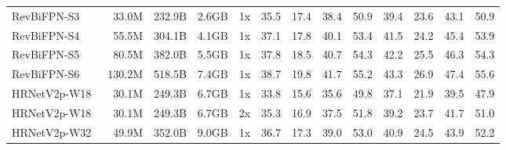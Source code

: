 \documentclass{article}
\begin{document}
\begin{table*}
{\begin{tabular}{lrrrrrrrrrrrr}
        RevBiFPN-S3                         \hspace{-10pt} &                   33.0M &                232.9B &                2.6GB & \hspace{-6pt}                  1x \hspace{-5pt} & 35.5 &     17.4 &     38.4 &     50.9 & 39.4 &     23.6 &     43.1 &     50.9 \\ 
        RevBiFPN-S4                         \hspace{-10pt} &                   55.5M &                304.1B &                4.1GB & \hspace{-6pt}                  1x \hspace{-5pt} & 37.1 &     17.8 &     40.1 &     53.4 & 41.5 &     24.2 &     45.4 &     53.9 \\ 
        RevBiFPN-S5                         \hspace{-10pt} &                   80.5M &                382.0B &                5.5GB & \hspace{-6pt}                  1x \hspace{-5pt} & 37.8 &     18.5 &     40.7 &     54.3 & 42.2 &     25.5 &     46.3 &     54.3 \\
        RevBiFPN-S6                         \hspace{-10pt} &                  130.2M &                518.5B &                7.4GB & \hspace{-6pt}                  1x \hspace{-5pt} & 38.7 &     19.8 &     41.7 &     55.2 & 43.3 &     26.9 &     47.4 &     55.6 \\ \midrule
        HRNetV2p-W18~\cite{wang2020hrnet}   \hspace{-10pt} &                   30.1M &                249.3B &                6.7GB & \hspace{-6pt}                  1x \hspace{-5pt} & 33.8 &     15.6 &     35.6 &     49.8 & 37.1 &     21.9 &     39.5 &     47.9 \\
        HRNetV2p-W18~\cite{wang2020hrnet}   \hspace{-10pt} &                   30.1M &                249.3B &                6.7GB & \hspace{-6pt}                  2x \hspace{-5pt} & 35.3 &     16.9 &     37.5 &     51.8 & 39.2 &     23.7 &     41.7 &     51.0 \\
        HRNetV2p-W32~\cite{wang2020hrnet}   \hspace{-10pt} &                   49.9M &                352.0B &                9.0GB & \hspace{-6pt}                  1x \hspace{-5pt} & 36.7 &     17.3 &     39.0 &     53.0 & 40.9 &     24.5 &     43.9 &     52.2 \\

\end{tabular}}
\end{table*}
\end{document}
